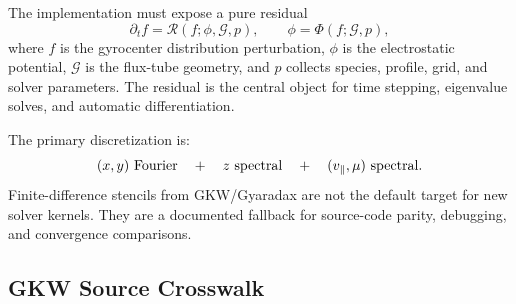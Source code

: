 \documentclass[11pt,a4paper]{article}
\newcommand{\vpar}{v_{\parallel}}
\newcommand{\RHS}{\mathcal{R}}
\begin{document}
The implementation must expose a pure residual
\begin{equation}
  \partial_t f = \RHS(f;\phi,\mathcal{G},p),
  \qquad
  \phi = \Phi(f;\mathcal{G},p),
  \label{eq:residual-contract}
\end{equation}
where \(f\) is the gyrocenter distribution perturbation, \(\phi\) is the electrostatic potential, \(\mathcal{G}\) is the flux-tube geometry, and \(p\) collects species, profile, grid, and solver parameters.  The residual is the central object for time stepping, eigenvalue solves, and automatic differentiation.

The primary discretization is:
\begin{equation}
  (x,y)\hbox{ Fourier}
  \quad+\quad
  z\hbox{ spectral}
  \quad+\quad
  (\vpar,\mu)\hbox{ spectral}.
  \label{eq:primary-discretization}
\end{equation}
Finite-difference stencils from GKW/Gyaradax are not the default target for new solver kernels.  They are a documented fallback for source-code parity, debugging, and convergence comparisons.

\subsection{GKW Source Crosswalk}
\end{document}
